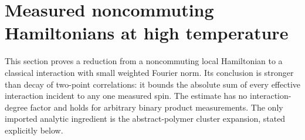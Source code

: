 \section{Measured noncommuting Hamiltonians at high temperature}
\label{res:quantum-clusters}

This section proves a reduction from a noncommuting local Hamiltonian to
a classical interaction with small weighted Fourier norm.  Its conclusion
is stronger than decay of two-point correlations: it bounds the absolute
sum of every effective interaction incident to any one measured spin.
The estimate has no interaction-degree factor and holds for arbitrary
binary product measurements.  The only imported analytic ingredient is
the abstract-polymer cluster expansion, stated explicitly below.



